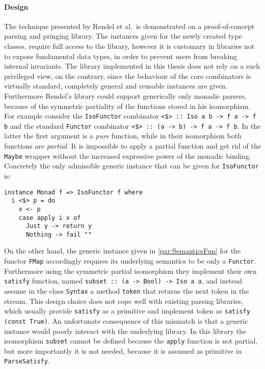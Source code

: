 \documentclass[../Thesis.tex]{subfiles}
\begin{document}
\paragraph{Design}
The technique presented by Rendel et al.\ is demonstrated 
on a proof-of-concept parsing and pringing library.
The instances given for the newly created type classes,
require full access to the library, however
it is customary in libraries not to expose fundamental data types, 
in order to prevent users from breaking internal invariants.
The library implemented in this thesis
does not rely on a such privileged view, on the contrary, 
since the behaviour of the core combinators is virtually
standard, completely general and reusable instances are given.
Furthermore Rendel's library could support generically only
monadic parsers, because of the symmetric partiality of
the functions stored in his isomorphism.
For example consider the \texttt{IsoFunctor} combinator
\texttt{<\$> :: Iso a b -> f a -> f b} and the standard
\texttt{Functor} combinator \texttt{<\$> :: (a -> b) -> f a -> f b}.
In the latter the first argument is a \emph{pure} function, while in their isomorphism
both functions are \emph{partial}. 
It is impossible to apply a partial function and get rid of the 
\texttt{Maybe} wrapper without the increased expressive power of the monadic binding.
Concretely the only admissible generic instance that can be 
given for \texttt{IsoFunctor} is:
\begin{verbatim}
instance Monad f => IsoFunctor f where 
  i <$> p = do
    x <- p
    case apply i x of
      Just y -> return y
      Nothing -> fail ""
\end{verbatim} 
On the other hand, the generic instance given in \ref{par:SemanticsFun} for
the functor \texttt{FMap} accordingly requires its underlying semantics to be
only a \texttt{Functor}.
Furthermore using the symmetric partial isomorphism they implement their 
own \texttt{satisfy} function, named \texttt{subset :: (a -> Bool) -> Iso a a},
and instead assume in the class \texttt{Syntax} a method
\texttt{token} that returns the next token in the stream.
This design choice does not cope well with existing parsing libraries,
which usually provide \texttt{satisfy} as a primitive and implement
token as \texttt{satisfy (const True)}. An unfortunate consequence 
of this mismatch is that a generic instance would poorly interact with
the underlying library.
In this library the isomorphism \texttt{subset} cannot be defined because
the \texttt{apply} function is not partial, but more importantly it
is not needed, because it is assumed as primitive in \texttt{ParseSatisfy}.
\end{document}
